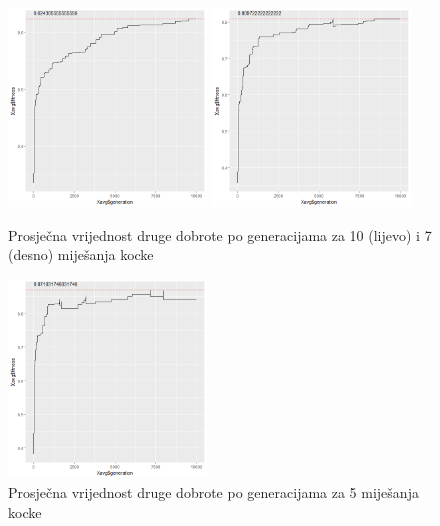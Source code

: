 \documentclass[times, utf8, seminar, numeric]{fer}
\begin{document}
  		\begin{figure}[ht!]
			\centering
			\includegraphics[width=0.47\textwidth]{../results/cubies_fitness/10_scrambles/cross0,5greedy10mut20.png}
			\includegraphics[width=0.47\textwidth]{../results/cubies_fitness/7_scrambles/cross0,5greedy10mut20.png}
			\caption{Prosječna vrijednost druge dobrote po generacijama za 10 (lijevo) i 7 (desno) miješanja kocke }
		\end{figure}
    
  		\begin{figure}[ht!]
			\centering
			\includegraphics[width=0.47\textwidth]{../results/cubies_fitness/5_scrambles/cross0,5greedy10mut20.png}
			\caption{Prosječna vrijednost druge dobrote po generacijama za 5 miješanja kocke }
		\end{figure}
\end{document}
